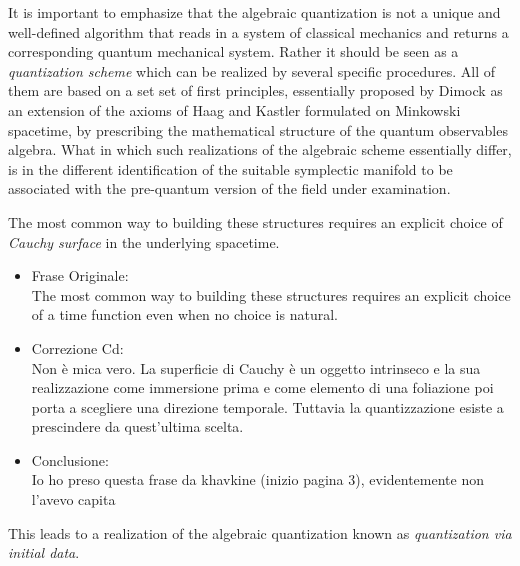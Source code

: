 \documentclass[Main]{subfiles}
\begin{document}
It is important to emphasize that the algebraic quantization is not a unique and well-defined algorithm that reads in a system of classical mechanics and returns a corresponding quantum mechanical system.
Rather it should be seen as a \emph{quantization scheme} which can be realized by several specific procedures.
All of them are based on a set set of first principles, essentially proposed by Dimock \cite{Dimock1980} as an extension of the axioms of Haag and Kastler formulated on Minkowski spacetime, by prescribing the mathematical structure of the quantum observables algebra.
What in which such realizations of the algebraic scheme essentially differ, is in the different identification of the suitable symplectic manifold  to be associated with the pre-quantum version of the field under examination.

The most common way to building these structures requires an explicit choice of \emph{Cauchy surface} in the underlying spacetime. 	
\ifToninus\begin{Warning}
	\begin{itemize}
		\item Frase Originale:\\
		The most common way to building these structures requires an explicit choice of a time function even when no choice is natural. 	
		\item Correzione Cd:\\
		Non è mica vero. La superficie di Cauchy è un oggetto intrinseco e  la sua realizzazione come immersione prima e come elemento di una foliazione poi porta a scegliere una direzione temporale. 
		Tuttavia la quantizzazione esiste a prescindere da quest'ultima scelta.
		\item Conclusione:\\
			Io ho preso questa frase da khavkine (inizio pagina 3), evidentemente non l'avevo capita
	\end{itemize}
\end{Warning}\fi
This leads to a  realization of the algebraic quantization known as \emph{quantization via initial data}.
\end{document}
